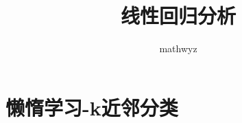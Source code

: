 \documentclass{amsart}
\title{线性回归分析}
\date{}
\author{mathwyz}
\begin{document}
\maketitle
\tableofcontents

\section{懒惰学习-k近邻分类}
\end{document}
